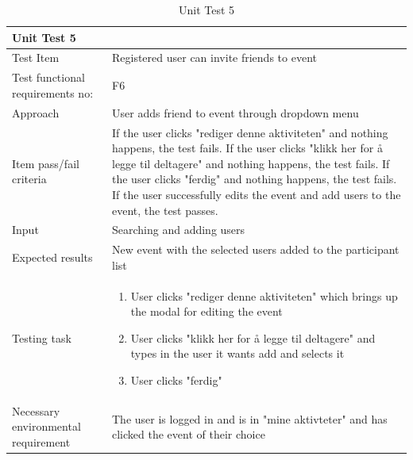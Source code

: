 \begin{table}[H]
\begin{tabular}{ | L{0.25\linewidth} | L{0.75\linewidth} | } 
 \hline {}
 Unit Test 5 & \\
 \hline
 Test Item & Registered user can invite friends to event\\ 
 \hline
 Test functional requirements no: & F6
 \\
 \hline
 Approach & User adds friend to event through dropdown menu\\ 
  \hline
 Item pass/fail criteria & If the user clicks "rediger denne aktiviteten" and nothing happens, the test fails. If the user clicks "klikk her for å legge til deltagere" and nothing happens, the test fails. If the user clicks "ferdig" and nothing happens, the test fails. If the user successfully edits the event and add users to the event, the test passes.\\ 
 \hline
 Input &  Searching and adding users\\ 
 \hline
 Expected results & New event with the selected users added to the participant list \\ 
  \hline
Testing task &
\vspace{-5mm}
    \begin{enumerate}[noitemsep]
  \item User clicks "rediger denne aktiviteten" which brings up the modal for editing the event
  \item User clicks "klikk her for å legge til deltagere" and types in the user it wants add and selects it
  \item User clicks "ferdig"
   \end{enumerate}\\
 \hline
 Necessary environmental requirement & The user is logged in and is in "mine aktivteter" and has clicked the event of their choice\\ 
 \hline
\end{tabular}
\caption{Unit Test 5}
\end{table}

